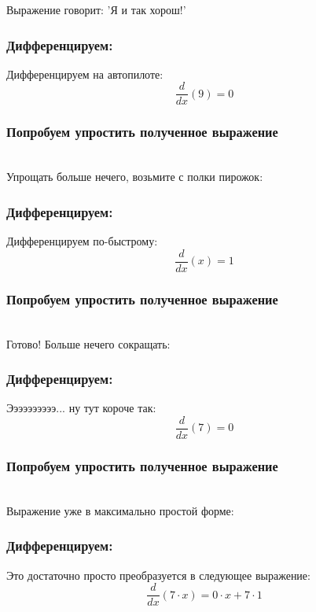 \documentclass[a4paper,12pt]{article}
\begin{document}
Выражение говорит: 'Я и так хорош!'

\subsubsection*{Дифференцируем:}

Дифференцируем на автопилоте:
\begin{dmath}\frac{d}{dx}\left(9\right)=0\end{dmath}
\subsubsection*{Попробуем упростить полученное выражение}
\\Упрощать больше нечего, возьмите с полки пирожок:

\subsubsection*{Дифференцируем:}

Дифференцируем по-быстрому:
\begin{dmath}\frac{d}{dx}\left(x\right)=1\end{dmath}
\subsubsection*{Попробуем упростить полученное выражение}
\\Готово! Больше нечего сокращать:

\subsubsection*{Дифференцируем:}

Ээээээээээ... ну тут короче так:
\begin{dmath}\frac{d}{dx}\left(7\right)=0\end{dmath}
\subsubsection*{Попробуем упростить полученное выражение}
\\Выражение уже в максимально простой форме:

\subsubsection*{Дифференцируем:}

Это достаточно просто преобразуется в следующее выражение:
\begin{dmath}\frac{d}{dx}\left(7\cdot x\right)=0\cdot x+ 7\cdot 1\end{dmath}
\end{document}
